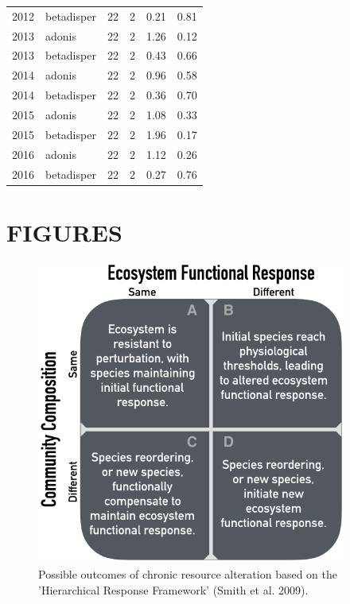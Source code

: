 \documentclass[fleqn,10pt,lineno]{wlpeerj} %
\begin{document}
\begin{table}[ht]
\begin{tabular}{rlrrrr}
  2012 & betadisper &  22 &   2 & 0.21 & 0.81 \\ 
  2013 & adonis &  22 &   2 & 1.26 & 0.12 \\ 
  2013 & betadisper &  22 &   2 & 0.43 & 0.66 \\ 
  2014 & adonis &  22 &   2 & 0.96 & 0.58 \\ 
  2014 & betadisper &  22 &   2 & 0.36 & 0.70 \\ 
  2015 & adonis &  22 &   2 & 1.08 & 0.33 \\ 
  2015 & betadisper &  22 &   2 & 1.96 & 0.17 \\ 
  2016 & adonis &  22 &   2 & 1.12 & 0.26 \\ 
  2016 & betadisper &  22 &   2 & 0.27 & 0.76 \\ 
   \hline
\end{tabular}
\endgroup
\end{table}

\newpage{}

\hypertarget{figures}{%
\section{FIGURES}\label{figures}}

\begin{figure}[!ht]
  \centering
      \includegraphics[width=4in]{../figures/hypothesis_figtable.png}
  \caption{Possible outcomes of chronic resource alteration based on the 'Hierarchical Response Framework' (Smith et al. 2009).}
\end{figure}

\newpage{}
\end{document}
